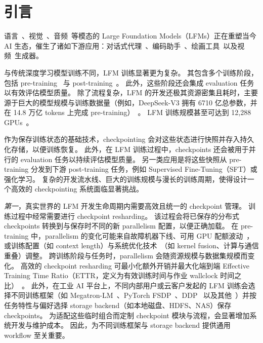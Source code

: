 \section{引言}
\label{sec:intro}

语言~\cite{gpt4,llama3.1, gemini1.5, deepseek-v3}、视觉~\cite{diffusion, dit}、音频~\cite{bark}等模态的 Large Foundation Models（LFMs）正在重塑当今 AI 生态，催生了诸如下游应用：对话式代理~\cite{chatgpt, character-ai}、编码助手~\cite{github-copilot}、绘画工具~\cite{midjourney}以及视频~\cite{sora}生成器。

与传统深度学习模型训练不同，LFM 训练显著更为复杂。
其包含多个训练阶段，包括 pre-training~\cite{gpt3, megascale} 与 post-training~\cite{wei2021sft,rlhf, hybridflow, ppo-framework}。
此外，这些阶段还会集成 evaluation 任务以有效评估模型质量。
除了流程复杂，LFM 的开发还极其资源密集且耗时，主要源于巨大的模型规模与训练数据量（例如，DeepSeek-V3 拥有 6710 亿总参数，并在 14.8 万亿 tokens 上完成 pre-training）~\cite{llama3.1, deepseek-v3}。
LFM 训练规模甚至可达到 12,288 GPUs~\cite{megascale}。

作为保存训练状态的基础技术，checkpointing 会对这些状态进行快照并存入持久化存储，以便训练恢复。
此外，在 LFM 训练过程中，checkpoints 还会被用于并行的 evaluation 任务以持续评估模型质量。
另一类应用是将这些快照从 pre-training 分发到下游 post-training 任务，例如 Supervised Fine-Tuning（SFT）或强化学习。
复杂的开发流水线、巨大的训练规模与漫长的训练周期，使得设计一个高效的 checkpointing 系统面临显著挑战。

\textit{第一}，真实世界的 LFM 开发生命周期内需要高效且统一的 checkpoint 管理。
训练过程中经常需要进行 checkpoint resharding。
该过程会将已保存的分布式 checkpoints 转换到与保存时不同的新 parallelism 配置，以便正确加载。
在 pre-training 中，parallelism 的变化可能来自故障机器下线、可用 GPU 配额波动~\cite{qsync,lyra}，或训练配置（如 context length）与系统优化技术~\cite{megascale}（如 kernel fusion、计算与通信重叠）调整。
跨训练阶段与任务时，parallelism 会随资源规模与数据集规模而变化。
高效的 checkpoint resharding 可最小化额外开销并最大化端到端 Effective Training Time Ratio（ETTR，定义为有效训练时间与作业 wallclock 时间之比）~\cite{meta-cluster}。
此外，在工业 AI 平台上，不同内部用户或云客户发起的 LFM 训练会选择不同训练框架（如 Megatron-LM~\cite{megatron}、PyTorch FSDP~\cite{fsdp}、DDP~\cite{ddp} 以及其他~\cite{vescale}）并按任务特性与偏好选择 storage backend（如本地磁盘、HDFS、NAS）保存 checkpoints。
为适配这些临时组合而定制 checkpoint 模块与流程，会显著增加系统开发与维护成本。
因此，为不同训练框架与 storage backend 提供通用 workflow 至关重要。

